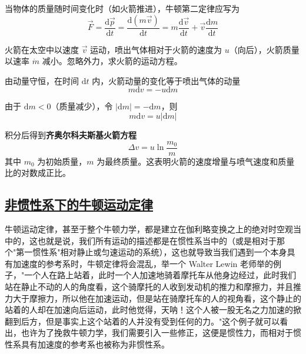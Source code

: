 当物体的质量随时间变化时（如火箭推进），牛顿第二定律应写为
\begin{equation}
    \vec{F} = \frac{\mathrm{d}\vec{p}}{\mathrm{d}t} = \frac{\mathrm{d}(m\vec{v})}{\mathrm{d}t} = m\frac{\mathrm{d}\vec{v}}{\mathrm{d}t} + \vec{v}\frac{\mathrm{d}m}{\mathrm{d}t}
\end{equation}

\begin{example}[火箭方程]
    火箭在太空中以速度 $\vec{v}$ 运动，喷出气体相对于火箭的速度为 $u$（向后），火箭质量以速率 $\dot{m}$ 减小。忽略外力，求火箭的运动方程。
    \begin{solution}
        由动量守恒，在时间 $\mathrm{d}t$ 内，火箭动量的变化等于喷出气体的动量
        \begin{equation}
            m\mathrm{d}v = -u\mathrm{d}m
        \end{equation}
        
        由于 $\mathrm{d}m < 0$（质量减少），令 $|\mathrm{d}m| = -\mathrm{d}m$，则
        \begin{equation}
            m\mathrm{d}v = u|\mathrm{d}m|
        \end{equation}
        
        积分后得到\textbf{齐奥尔科夫斯基火箭方程}
        \begin{equation}
            \Delta v = u\ln\frac{m_0}{m}
        \end{equation}
        其中 $m_0$ 为初始质量，$m$ 为最终质量。这表明火箭的速度增量与喷气速度和质量比的对数成正比。
    \end{solution}
\end{example}


\subsection{\protect\hyperlink{:}{非惯性系下的牛顿运动定律}}
牛顿运动定律，甚至于整个牛顿力学，都是建立在伽利略变换之上的绝对时空观当中的，这也就是说，我们所有运动的描述都是在惯性系当中的（或是相对于那个"第一惯性系"相对静止或匀速运动的系统），这也就导致当我们遇到一个本身具有加速度的参考系时，牛顿定律将会混乱，举一个 Walter Lewin 老师举的例子，"一个人在路上站着，此时一个人加速地骑着摩托车从他身边经过，此时我们站在静止不动的人的角度看，这个骑摩托的人收到发动机的推力和摩擦力，并且推力大于摩擦力，所以他在加速运动，但是站在骑摩托车的人的视角看，这个静止的站着的人却在加速向后运动，此时他觉得，天呐！这个人被一股无名之力加速的掀翻到后方，但是事实上这个站着的人并没有受到任何的力。"这个例子就可以看出，也许为了挽救牛顿力学，我们需要引入一些修正，这便是惯性力，而相对于惯性系具有加速度的参考系也被称为非惯性系。

